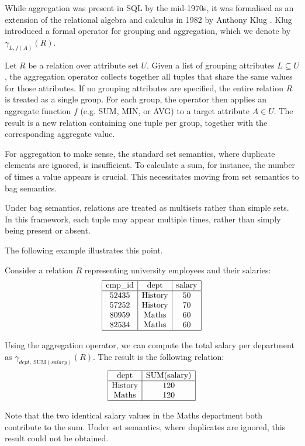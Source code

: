 \documentclass[oneside, 11pt]{amsbook}
\theoremstyle{plain}
\theoremstyle{definition}
\theoremstyle{remark}
\begin{document}
While aggregation was present in SQL by the mid-1970s, it was formalised as an extension of the relational algebra and calculus in 1982 by Anthony Klug \cite{Klug1982}. Klug introduced a formal operator for grouping and aggregation, which we denote by $\gamma_{L, f(A)}(R)$.

Let $R$ be a relation over attribute set $U$. Given a list of grouping attributes $L \subseteq U$, the aggregation operator collects together all tuples that share the same values for those attributes. If no grouping attributes are specified, the entire relation $R$ is treated as a single group. For each group, the operator then applies an aggregate function $f$ (e.g. SUM, MIN, or AVG) to a target attribute $A \in U$. The result is a new relation containing one tuple per group, together with the corresponding aggregate value.

For aggregation to make sense, the standard set semantics, where duplicate elements are ignored, is insufficient. To calculate a sum, for instance, the number of times a value appears is crucial. This necessitates moving from set semantics to bag semantics.

Under bag semantics, relations are treated as multisets rather than simple sets. In this framework, each tuple may appear multiple times, rather than simply being present or absent.

The following example illustrates this point.

\begin{exmpl}
    Consider a relation $R$ representing university employees and their salaries:
    \[
        \begin{array}{|c|c|c|}
            \hline
            \text{emp\_id} & \text{dept}    & \text{salary} \\
            \hline
            52435          & \text{History} & 50            \\
            57252          & \text{History} & 70            \\
            80959          & \text{Maths}   & 60            \\
            82534          & \text{Maths}   & 60            \\
            \hline
        \end{array}
    \]

    Using the aggregation operator, we can compute the total salary per department as $\gamma_{\textit{dept},\ \text{SUM}(\textit{salary})}(R)$. The result is the following relation:
    \[
        \begin{array}{|c|c|}
            \hline
            \text{dept}    & \text{SUM(salary)} \\
            \hline
            \text{History} & 120                \\
            \text{Maths}   & 120                \\
            \hline
        \end{array}
    \]

    Note that the two identical salary values in the Maths department both contribute to the sum. Under set semantics, where duplicates are ignored, this result could not be obtained.
\end{exmpl}
\end{document}
